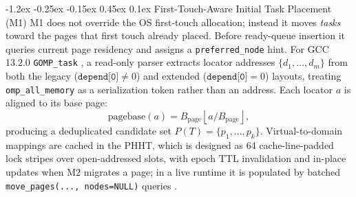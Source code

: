 \documentclass[10pt,twocolumn,letterpaper]{article}
\makeatletter
\renewcommand{\subsection}{\@startsection{subsection}{2}{\z@}%
  {-1.2ex \@plus -0.25ex \@minus -0.15ex}%
  {0.45ex \@plus 0.1ex}%
  {\normalfont\small\itshape}}
\makeatother
\begin{document}
\begin{table}[!t]
\centering
\caption{Summary of Mathematical Notation}
\label{tab:symbols}
\end{table}

\subsection{First-Touch-Aware Initial Task Placement (M1)}
M1 does not override the OS first-touch allocation; instead it moves \emph{tasks} toward the pages that first touch already placed. Before ready-queue insertion it queries current page residency and assigns a \texttt{preferred\_node} hint. For GCC 13.2.0 \texttt{GOMP\_task} \cite{ref8}, a read-only parser extracts locator addresses $\{d_1,\dots,d_m\}$ from both the legacy ($\texttt{depend[0]} \ne 0$) and extended ($\texttt{depend[0]} = 0$) layouts, treating \texttt{omp\_all\_memory} as a serialization token rather than an address. Each locator $a$ is aligned to its base page:
\begin{equation}
\mathrm{pagebase}(a) = B_{\mathrm{page}} \left\lfloor a / B_{\mathrm{page}} \right\rfloor,
\label{eq:pagebase}
\end{equation}
producing a deduplicated candidate set $P(T) = \{p_1,\dots,p_k\}$. Virtual-to-domain mappings are cached in the PHHT, which is designed as 64 cache-line-padded lock stripes over open-addressed slots, with epoch TTL invalidation and in-place updates when M2 migrates a page; in a live runtime it is populated by batched \texttt{move\_pages(..., nodes=NULL)} queries \cite{ref14}.
\end{document}
